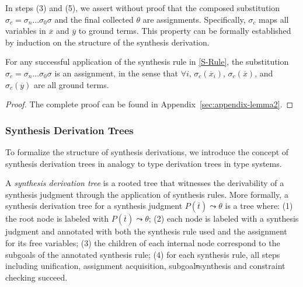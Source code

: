 \documentclass[manuscript,screen]{acmart}
\makeatletter
\newcommand{\skhzc}[1]{#1}
\newcommand{\welltyped}[1]{\mathit{well\text{-}typed}\left(#1\right)}
\providecommand{\DIFdel}[1]{{\protect\color{red}\sout{#1}}} %
\providecommand{\DIFdelbegin}{} %
\providecommand{\DIFdelend}{} %
\providecommand{\DIFscaledelfig}{0.5}
\newlength{\DIFdelgraphicswidth} %
\newlength{\DIFdelgraphicsheight} %
\providecommand{\DIFdelincludegraphics}[2][]{%
\sbox{\DIFdelgraphicsbox}{\DIFOincludegraphics[#1]{#2}}%
\settoboxwidth{\DIFdelgraphicswidth}{\DIFdelgraphicsbox} %
\settoboxtotalheight{\DIFdelgraphicsheight}{\DIFdelgraphicsbox} %
\scalebox{\DIFscaledelfig}{%
\parbox[b]{\DIFdelgraphicswidth}{\usebox{\DIFdelgraphicsbox}\\[-\baselineskip] \rule{\DIFdelgraphicswidth}{0em}}\llap{\resizebox{\DIFdelgraphicswidth}{\DIFdelgraphicsheight}{%
\setlength{\unitlength}{\DIFdelgraphicswidth}%
\begin{picture}(1,1)%
\thicklines\linethickness{2pt} %
{\color[rgb]{1,0,0}\put(0,0){\framebox(1,1){}}}%
{\color[rgb]{1,0,0}\put(0,0){\line( 1,1){1}}}%
{\color[rgb]{1,0,0}\put(0,1){\line(1,-1){1}}}%
\end{picture}%
}\hspace*{3pt}}} %
} %
\DeclareRobustCommand{\DIFdelbegin}{\DIFOdelbegin \let\includegraphics\DIFdelincludegraphics} %
\DeclareRobustCommand{\DIFdelend}{\DIFOaddend \let\includegraphics\DIFOincludegraphics} %
\let\sout@orig\sout %
\renewcommand{\sout}[1]{\ifmmode\text{\sout@orig{\ensuremath{#1}}}\else\sout@orig{#1}\fi} %
\makeatother
\begin{document}
In steps (3) and (5), we assert without proof that the composed substitution $\sigma_c = \sigma_n \ldots \sigma_0 \sigma$ and the final collected $\theta$ are assignments. Specifically, $\sigma_c$ maps all variables in $\overline{x}$ and $\overline{y}$ to ground terms. This property can be formally established by induction on the structure of the synthesis derivation.

\begin{lemma}
\label{lemma:assignment}
For any successful application of the synthesis rule in \autoref{S-Rule}, the substitution $\sigma_c = \sigma_n \ldots \sigma_0 \sigma$ is an assignment, in the sense that $\forall i$, $\sigma_c(\skhzc{\overline{x}_i})$, $\sigma_c(\skhzc{\overline{x}})$, and $\sigma_c(\skhzc{\overline{y}})$ are all ground terms.
\end{lemma}
\begin{proof}
  The complete proof can be found in Appendix~\ref{sec:appendix-lemma2}.
\end{proof}

\subsubsection{Synthesis Derivation Trees}
\label{sec:synthesis-derivation-tree}
To formalize the structure of synthesis derivations, we introduce the concept of synthesis derivation trees in analogy to type derivation trees in type systems. 

A \emph{synthesis derivation tree} is a rooted tree that witnesses the derivability of a synthesis judgment through the application of synthesis rules. More formally, a synthesis derivation tree for a synthesis judgment $P(\skhzc{\overline{t}}) \leadsto \theta$ is a tree where: (1) the root node is labeled with $P(\skhzc{\overline{t}}) \leadsto \theta$; (2) each node is labeled with a synthesis judgment and annotated with both the synthesis rule used and the assignment for its free variables; (3) the children of each internal node correspond to the subgoals of the annotated synthesis rule; (4) for each synthesis rule, all steps including unification, assignment acquisition, subgoal\DIFdelbegin \DIFdel{s}\DIFdelend  synthesis and constraint checking succeed.
\end{document}
